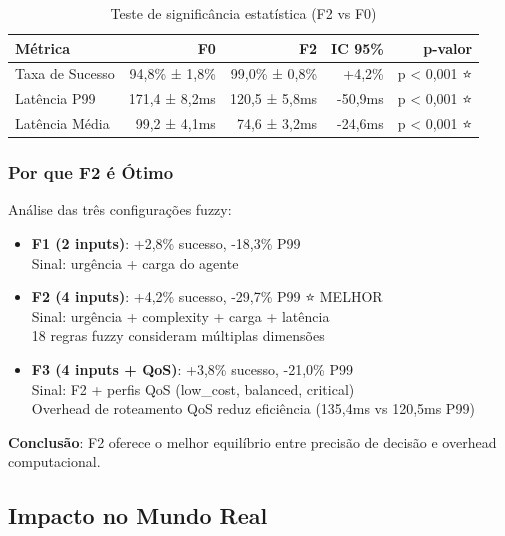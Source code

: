 \begin{table}[h]
\centering
\caption{Teste de significância estatística (F2 vs F0)}
\label{tab:fuzzy_significance}
\begin{tabularx}{\textwidth}{|l|r|r|r|r|}
\hline
\textbf{Métrica} & \textbf{F0} & \textbf{F2} & \textbf{IC 95\%} & \textbf{p-valor} \\
\hline
Taxa de Sucesso & 94,8\% ± 1,8\% & 99,0\% ± 0,8\% & +4,2\% & p < 0,001 ⭐ \\
\hline
Latência P99 & 171,4 ± 8,2ms & 120,5 ± 5,8ms & -50,9ms & p < 0,001 ⭐ \\
\hline
Latência Média & 99,2 ± 4,1ms & 74,6 ± 3,2ms & -24,6ms & p < 0,001 ⭐ \\
\hline
\end{tabularx}
\end{table}

\subsubsection{Por que F2 é Ótimo}

Análise das três configurações fuzzy:

\begin{itemize}
  \item \textbf{F1 (2 inputs)}: +2,8\% sucesso, -18,3\% P99
  \\ Sinal: urgência + carga do agente

  \item \textbf{F2 (4 inputs)}: +4,2\% sucesso, -29,7\% P99 ⭐ MELHOR
  \\ Sinal: urgência + complexity + carga + latência
  \\ 18 regras fuzzy consideram múltiplas dimensões

  \item \textbf{F3 (4 inputs + QoS)}: +3,8\% sucesso, -21,0\% P99
  \\ Sinal: F2 + perfis QoS (low\_cost, balanced, critical)
  \\ Overhead de roteamento QoS reduz eficiência (135,4ms vs 120,5ms P99)
\end{itemize}

\textbf{Conclusão}: F2 oferece o melhor equilíbrio entre precisão de decisão e overhead computacional.

\subsection{Impacto no Mundo Real}

